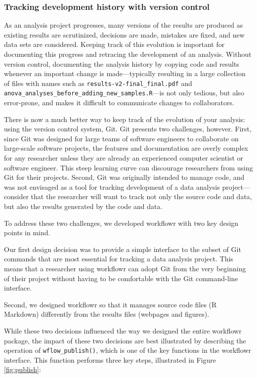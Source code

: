\documentclass[9pt,a4paper]{extarticle}
\begin{document}
\subsubsection*{Tracking development history with version control}

As an analysis project progresses, many versions of the results are
produced as existing results are scrutinized, decisions are made,
mistakes are fixed, and new data sets are considered. Keeping track of
this evolution is important for documenting this progress and retracing
the development of an analysis. Without version control, documenting the
analysis history by copying code and results whenever an important
change is made—typically resulting in a large collection of files with
names such as \verb|results-v2-final_final.pdf| and
\verb|anova_analyses_before_adding_new_samples.R|—is not only tedious,
but also error-prone, and makes it difficult to communicate changes to
collaborators.

There is now a much better way to keep track of the evolution of your
analysis: using the version control system, Git. Git presents two
challenges, however. First, since Git was designed for large teams of
software engineers to collaborate on large-scale software projects, the
features and documentation are overly complex for any researcher unless
they are already an experienced computer scientist or software engineer.
This steep learning curve can discourage researchers from using Git for
their projects. Second, Git was originally intended to manage code, and
was not envisaged as a tool for tracking development of a data analysis
project—consider that the researcher will want to track not only the
source code and data, but also the results generated by the code and
data.

To address these two challenges, we developed workflowr with two key
design points in mind.

Our first design decision was to provide a simple interface to the
subset of Git commands that are most essential for tracking a data
analysis project. This means that a researcher using workflowr can adopt
Git from the very beginning of their project without having to be
comfortable with the Git command-line interface.

Second, we designed workflowr so that it manages source code files (R
Markdown) differently from the results files (webpages and figures).

While these two decisions influenced the way we designed the entire
workflowr package, the impact of these two decisions are best
illustrated by describing the operation of \verb|wflow_publish()|, which is one
of the key functions in the workflowr interface. This function performs
three key steps, illustrated in Figure \ref{fig:publish}:
\end{document}
